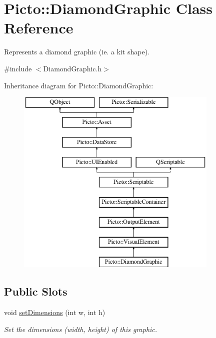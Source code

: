 \hypertarget{class_picto_1_1_diamond_graphic}{\section{Picto\-:\-:Diamond\-Graphic Class Reference}
\label{class_picto_1_1_diamond_graphic}
}


Represents a diamond graphic (ie. a kit shape).  




{\ttfamily \#include $<$Diamond\-Graphic.\-h$>$}

Inheritance diagram for Picto\-:\-:Diamond\-Graphic\-:\begin{figure}[H]
\begin{center}
\leavevmode
\includegraphics[height=9.000000cm]{class_picto_1_1_diamond_graphic}
\end{center}
\end{figure}
\subsection*{Public Slots}
\begin{DoxyCompactItemize}
\item 
\hypertarget{class_picto_1_1_diamond_graphic_a5ced32fbb78476c165309a265b67b593}{void \hyperlink{class_picto_1_1_diamond_graphic_a5ced32fbb78476c165309a265b67b593}{set\-Dimensions} (int w, int h)}\label{class_picto_1_1_diamond_graphic_a5ced32fbb78476c165309a265b67b593}

\begin{DoxyCompactList}\small\item\em Set the dimensions (width, height) of this graphic. \end{DoxyCompactList}\end{DoxyCompactItemize}
